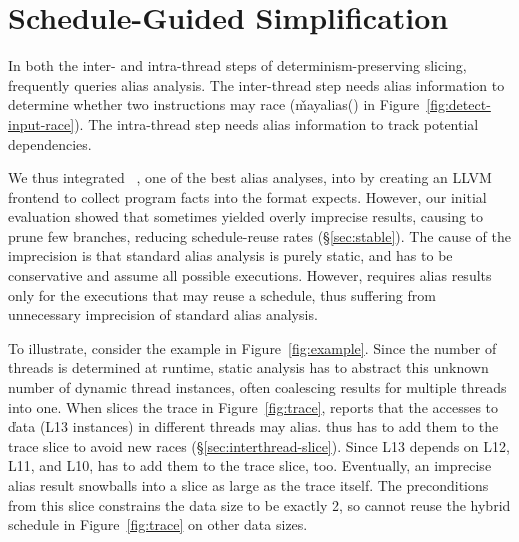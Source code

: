 \section{Schedule-Guided Simplification} \label{sec:guide}

In both the inter- and intra-thread steps of determinism-preserving
slicing, \peregrine frequently queries alias analysis.  The inter-thread step
needs alias information to determine whether two instructions may race
(\v{mayalias()} in Figure~\ref{fig:detect-input-race}).  The intra-thread step
needs alias information to track potential dependencies.

We thus integrated \bddbddb~\cite{bddbddb,bddalias:pldi04}, one of the best alias analyses,
into \peregrine by creating an LLVM frontend to collect program facts into
the format \bddbddb expects.  However, our initial evaluation showed that
\bddbddb sometimes yielded overly imprecise results, causing \peregrine to prune
few branches, reducing schedule-reuse rates (\S\ref{sec:stable}).  The
cause of the imprecision is that
standard alias analysis is purely static, and has to be conservative and
assume all possible executions.  However, \peregrine requires alias results
only for the executions that may reuse a schedule, thus suffering
from unnecessary imprecision of standard alias analysis.







To illustrate, consider the example in Figure~\ref{fig:example}.  Since the
number of threads is determined at runtime, static analysis has to abstract
this unknown number of dynamic thread instances, often coalescing
results for multiple threads into one.  When \peregrine slices the trace in
Figure~\ref{fig:trace}, \bddbddb reports that the accesses to \v{data} 
(L13 instances) in different threads may alias.
\peregrine thus has to add them to the trace slice to avoid new races
(\S\ref{sec:interthread-slice}).  Since L13 depends 
on L12, L11, and L10, \peregrine has to add them to the trace slice, too.
Eventually, an imprecise alias result snowballs into a slice
as large as the trace itself.  The preconditions from this slice
constrains the data size to be exactly 2, so \peregrine cannot reuse
the hybrid schedule in Figure~\ref{fig:trace} on other data sizes.


